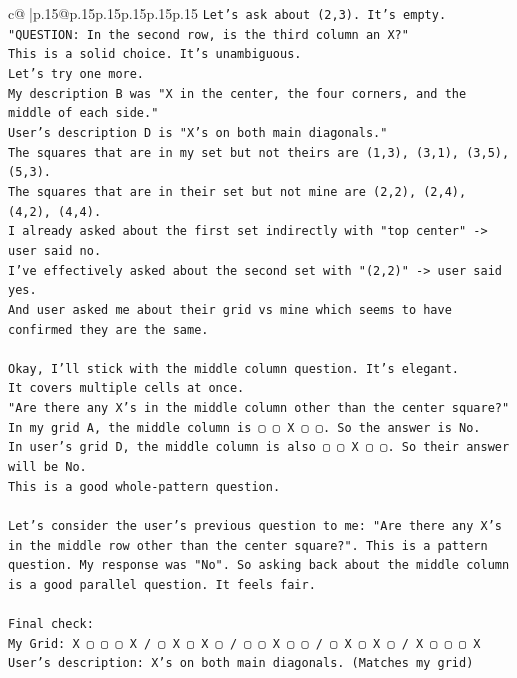 \documentclass{article}
\begin{document}
{\begin{supertabular}{c@{$\;$}|p{.15\linewidth}@{}p{.15\linewidth}p{.15\linewidth}p{.15\linewidth}p{.15\linewidth}p{.15\linewidth}}
{{{\texttt{Let's ask about (2,3). It's empty.} \\
\texttt{"QUESTION: In the second row, is the third column an X?"} \\
\texttt{This is a solid choice. It's unambiguous.} \\
\texttt{Let's try one more.} \\
\texttt{My description B was "X in the center, the four corners, and the middle of each side."} \\
\texttt{User's description D is "X's on both main diagonals."} \\
\texttt{The squares that are in my set but not theirs are (1,3), (3,1), (3,5), (5,3).} \\
\texttt{The squares that are in their set but not mine are (2,2), (2,4), (4,2), (4,4).} \\
\texttt{I already asked about the first set indirectly with "top center" {-}> user said no.} \\
\texttt{I've effectively asked about the second set with "(2,2)" {-}> user said yes.} \\
\texttt{And user asked me about their grid vs mine which seems to have confirmed they are the same.} \\
\\ 
\texttt{Okay, I'll stick with the middle column question. It's elegant.} \\
\texttt{It covers multiple cells at once.} \\
\texttt{"Are there any X's in the middle column other than the center square?"} \\
\texttt{In my grid A, the middle column is ▢ ▢ X ▢ ▢. So the answer is No.} \\
\texttt{In user's grid D, the middle column is also ▢ ▢ X ▢ ▢. So their answer will be No.} \\
\texttt{This is a good whole{-}pattern question.} \\
\\ 
\texttt{Let's consider the user's previous question to me: "Are there any X's in the middle row other than the center square?". This is a pattern question. My response was "No". So asking back about the middle column is a good parallel question. It feels fair.} \\
\\ 
\texttt{Final check:} \\
\texttt{My Grid: X ▢ ▢ ▢ X / ▢ X ▢ X ▢ / ▢ ▢ X ▢ ▢ / ▢ X ▢ X ▢ / X ▢ ▢ ▢ X} \\
\texttt{User's description: X's on both main diagonals. (Matches my grid)} \\
}}}
\end{supertabular}}
\end{document}
